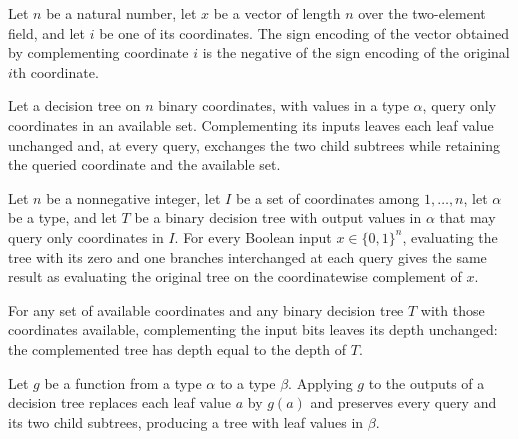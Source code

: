 \begin{theorem}
\label{FABL.signEncode_binaryCubeComplement}
\leanok
{}
Let $n$ be a natural number, let $x$ be a vector of length $n$ over the two-element
field, and let $i$ be one of its coordinates. The sign encoding of the vector obtained
by complementing coordinate $i$ is the negative of the sign encoding of the original
$i$th coordinate.
\end{theorem}

\begin{definition}
\leanok
{}
Let a decision tree on $n$ binary coordinates, with values in a type $\alpha$, query
only coordinates in an available set. Complementing its inputs leaves each leaf value
unchanged and, at every query, exchanges the two child subtrees while retaining the
queried coordinate and the available set.
\end{definition}

\begin{theorem}
\leanok
{}
Let $n$ be a nonnegative integer, let $I$ be a set of coordinates among
$1,\ldots,n$, let $\alpha$ be a type, and let $T$ be a binary decision tree with
output values in $\alpha$ that may query only coordinates in $I$. For every Boolean
input $x\in\{0,1\}^n$, evaluating the tree with its zero and one branches interchanged
at each query gives the same result as evaluating the original tree on the
coordinatewise complement of $x$.
\end{theorem}

\begin{theorem}
\leanok
{}
For any set of available coordinates and any binary decision tree $T$ with those
coordinates available, complementing the input bits leaves its depth unchanged: the
complemented tree has depth equal to the depth of $T$.
\end{theorem}

\begin{definition}
\leanok
{}
Let $g$ be a function from a type $\alpha$ to a type $\beta$. Applying $g$ to the
outputs of a decision tree replaces each leaf value $a$ by $g(a)$ and preserves every
query and its two child subtrees, producing a tree with leaf values in $\beta$.
\end{definition}

